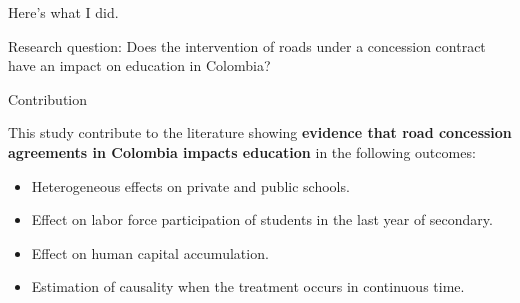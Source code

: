 \documentclass[9pt]{beamer}
\begin{document}

\begin{frame}{Here's what I did.}
\justifying

    \begin{block}{Research question:}
     Does the intervention of roads under a concession contract have an impact on education in Colombia?
    \end{block}
 
    
 \end{frame}
 

\begin{frame}{Contribution \hyperlink{rev.literature}{} }
     \label{contribution}
     
This study contribute to the literature showing \textbf{evidence that road concession agreements in Colombia impacts education} in the following outcomes:

\begin{itemize}
        \item Heterogeneous effects on private and public schools.
        \item Effect on labor force participation of students in the last year of secondary.
        \item Effect on human capital accumulation.
        \item Estimation of causality when the treatment occurs in continuous time.
  \end{itemize}
\end{frame}

\end{document}

